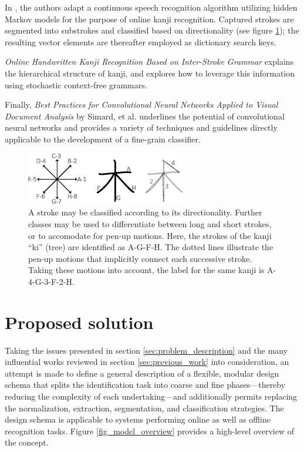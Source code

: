 \documentclass[10pt,conference,a4paper]{IEEEtran}
\begin{document}
	In \cite{nakai2001substroke}, the authors adapt a continuous speech recognition algorithm utilizing
	hidden Markov models for the purpose of online kanji recognition. Captured strokes are segmented into
	substrokes and classified based on directionality (see figure \ref{fig_stroke_categories});
	the resulting vector elements are thereafter employed as dictionary search keys.


	\emph{Online Handwritten Kanji Recognition Based on Inter-Stroke Grammar} explains the hierarchical structure of kanji,
	and explores how to leverage this information using stochastic context-free grammars. \cite{ota2007online}

	Finally, \emph{Best Practices for Convolutional Neural Networks Applied to Visual Document Analysis} by Simard, et al. underlines the
	potential of convolutional neural networks and provides a variety of techniques and guidelines directly applicable to the development of a fine-grain classifier. \cite{simard2003best}


	\begin{figure}
		\centering
		\includegraphics[width=2.75in]{./fig/stroke-categories.eps}
		\caption{A stroke may be classified according to its directionality.
			Further classes may be used to differentiate between long and short strokes,
		or to accomodate for pen-up motions. Here, the strokes of the kanji ``ki'' (tree) are identified as A-G-F-H.
		The dotted lines illustrate the pen-up motions that implicitly connect each successive stroke. Taking these motions into account,
		the label for the same kanji is A-4-G-3-F-2-H.}
		\label{fig_stroke_categories}
	\end{figure}



	\section{Proposed solution}
	\label{sec:proposed_solution}

	Taking the issues presented in section \ref{sec:problem_description} and the many influential works reviewed in section \ref{sec:previous_work}
	into consideration, an attempt is made to define a general description of a flexible, modular 
	design schema that splits the identification task into coarse and fine phases---thereby reducing the complexity of each undertaking---and 
	additionally permits replacing the normalization, extraction, segmentation, and classification strategies.
	The design schema is applicable to systems performing online as well as offline recognition tasks.
	Figure \ref{fig_model_overview} provides a high-level overview of the concept.
\end{document}
